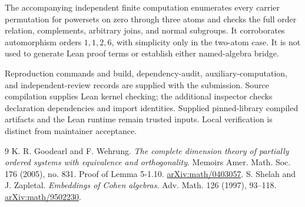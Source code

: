 \documentclass[11pt]{article}
\begin{document}
The accompanying independent finite computation enumerates every carrier permutation for powersets on zero through three atoms and checks the full order relation, complements, arbitrary joins, and normal subgroups. It corroborates automorphism orders $1,1,2,6$, with simplicity only in the two-atom case. It is not used to generate Lean proof terms or establish either named-algebra bridge.

Reproduction commands and build, dependency-audit, auxiliary-computation, and independent-review records are supplied with the submission. Source compilation supplies Lean kernel checking; the additional inspector checks declaration dependencies and import identities. Supplied pinned-library compiled artifacts and the Lean runtime remain trusted inputs. Local verification is distinct from maintainer acceptance.

\begin{thebibliography}{9}
 K. R. Goodearl and F. Wehrung.
\emph{The complete dimension theory of partially ordered systems with equivalence and orthogonality}.
Memoirs Amer. Math. Soc. 176 (2005), no. 831.
Proof of Lemma 5-1.10.
\href{https://arxiv.org/abs/math/0403057}{arXiv:math/0403057}.
 S. Shelah and J. Zapletal.
\emph{Embeddings of Cohen algebras}.
Adv. Math. 126 (1997), 93--118.
\href{https://arxiv.org/abs/math/9502230}{arXiv:math/9502230}.
\end{thebibliography}
\end{document}
